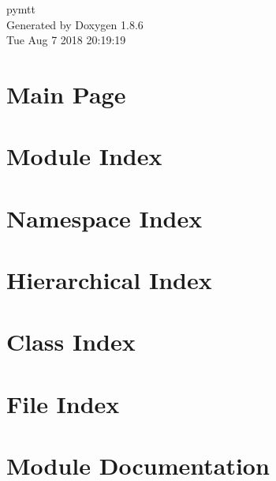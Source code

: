 \documentclass[twoside]{book}
\newcommand{\clearemptydoublepage}{%
  \newpage{\pagestyle{empty}\cleardoublepage}%
}
\begin{document}
\hypersetup{pageanchor=false}
\begin{titlepage}
\vspace*{7cm}
\begin{center}%
{\Large pymtt }\\
\vspace*{1cm}
{\large Generated by Doxygen 1.8.6}\\
\vspace*{0.5cm}
{\small Tue Aug 7 2018 20:19:19}\\
\end{center}
\end{titlepage}
\clearemptydoublepage
\tableofcontents
\clearemptydoublepage
{}
\hypersetup{pageanchor=true}

\chapter{Main Page}
\label{index}\hypertarget{index}{}
\chapter{Module Index}

\chapter{Namespace Index}

\chapter{Hierarchical Index}

\chapter{Class Index}

\chapter{File Index}

\chapter{Module Documentation}






















\end{document}
